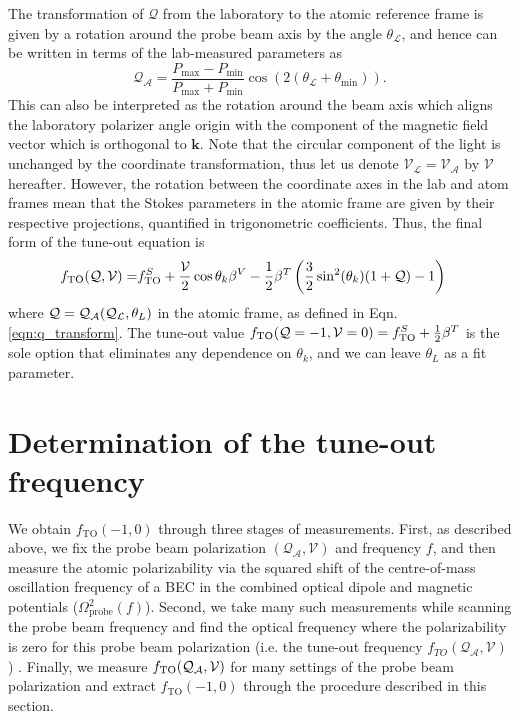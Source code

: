 	The transformation of $\mathcal{Q}$ from the laboratory to the atomic reference frame is given by a rotation around the probe beam axis by the angle \(\mathcal{\theta_{L}}\),
	and hence can be written in terms of the lab-measured parameters as
	\begin{equation}
	 \mathcal{Q_{A}} =\frac{P_{\mathrm{max}}-P_{\mathrm{min}}}{P_{\mathrm{max}}+P_{\mathrm{min}}} \cos(2(\mathcal{\theta_{L}}+\theta_{\mathrm{min}})).
	 \label{eqn:q_transform}
	\end{equation}
	This can also be interpreted as the rotation around the beam axis which aligns the laboratory polarizer angle origin with the component of the magnetic field vector which is orthogonal to $\mathbf{k}$. 
	Note that the circular component of the light is unchanged by the coordinate transformation, thus let us denote \(\mathcal{V_{L}}=\mathcal{V_{A}}\) by  \(\mathcal{V}\) hereafter.
	However, the rotation between the coordinate axes in the lab and atom frames mean that the Stokes parameters in the atomic frame are given by their respective projections, quantified in trigonometric coefficients.
	Thus, the final form of the tune-out equation is
	\begin{align}
		 f_\mathrm{TO}(\mathcal{Q},\mathcal{V}) = & f_\mathrm{TO}^S + \frac{\mathcal{V}}{2}\cos{\theta_k}\beta^V - \frac{1}{2}\beta^T \left(\frac{3}{2}\sin^2(\theta_k)(1+\mathcal{Q}) - 1\right)
		 \label{eqn:tune_out_eq}
	\end{align}
	where $\mathcal{Q}=\mathcal{Q_A}(\mathcal{Q_L},\theta_L)$ in the atomic frame, as defined in Eqn. \ref{eqn:q_transform}. 
	The tune-out value $f_\mathrm{TO}(\mathcal{Q}=-1,\mathcal{V}=0)= f_\mathrm{TO}^S + \frac{1}{2}\beta^T$ is the sole option that eliminates any dependence on $\theta_k$, and we can leave $\theta_L$ as a fit parameter.

\section{Determination of the tune-out frequency}

	We obtain \(f_{\mathrm{TO}}(-1,0)\) through three stages of measurements. 
	First, as described above, we fix the probe beam polarization $(\mathcal{Q_A},\mathcal{V})$ and frequency $f$, and then measure the atomic polarizability via the squared shift of the centre-of-mass oscillation frequency of a BEC in the combined optical dipole and magnetic potentials ($\Omega_\mathrm{probe}^{2}(f)$).
	Second, we take many such measurements while scanning the probe beam frequency and find the optical frequency where the polarizability is zero for this probe beam polarization (i.e. the tune-out frequency \(f_{TO}(\mathcal{Q_A},\mathcal{V})\)) . 
	Finally, we measure $f_\mathrm{TO}(\mathcal{Q_A},\mathcal{V})$ for many settings of the probe beam polarization and extract \(f_{\mathrm{TO}}(-1,0)\) through the procedure described in this section. 
	

